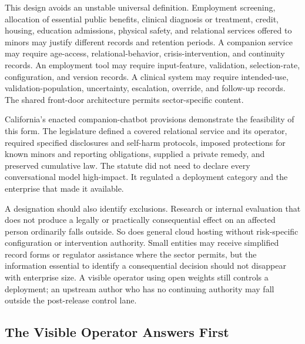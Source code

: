 This design avoids an unstable universal definition. Employment screening, allocation of essential public benefits, clinical diagnosis or treatment, credit, housing, education admissions, physical safety, and relational services offered to minors may justify different records and retention periods. A companion service may require age-access, relational-behavior, crisis-intervention, and continuity records. An employment tool may require input-feature, validation, selection-rate, configuration, and version records. A clinical system may require intended-use, validation-population, uncertainty, escalation, override, and follow-up records. The shared front-door architecture permits sector-specific content.

California's enacted companion-chatbot provisions demonstrate the feasibility of this form. The legislature defined a covered relational service and its operator, required specified disclosures and self-harm protocols, imposed protections for known minors and reporting obligations, supplied a private remedy, and preserved cumulative law. The statute did not need to declare every conversational model high-impact. It regulated a deployment category and the enterprise that made it available.

A designation should also identify exclusions. Research or internal evaluation that does not produce a legally or practically consequential effect on an affected person ordinarily falls outside. So does general cloud hosting without risk-specific configuration or intervention authority. Small entities may receive simplified record forms or regulator assistance where the sector permits, but the information essential to identify a consequential decision should not disappear with enterprise size. A visible operator using open weights still controls a deployment; an upstream author who has no continuing authority may fall outside the post-release control lane.

\subsection{The Visible Operator Answers First}
\label{sec:gateway}


